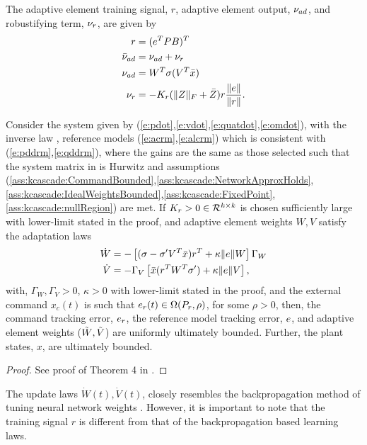 The adaptive element training signal, $r$, adaptive element output, $\nu_{ad}$, and robustifying
term, $\nu_r$, are given by
\[
\begin{split}
r      &= (e^TPB)^T \\
\bar{\nu}_{ad} &= \nu_{ad} + \nu_r \\
\nu_{ad}  &= W^T\sigma(V^T\bar{x}) \\
\nu_r   &= -K_r(\|Z\|_F + \bar{Z})r\frac{\|e\|}{\|r\|}.
\end{split}
\]

\begin{theorem}
\label{t:boundedness}
Consider the system
given by (\ref{e:pdot},\ref{e:vdot},\ref{e:quatdot},\ref{e:omdot}), with the inverse law
, reference models (\ref{e:acrm},\ref{e:alcrm}) which
is consistent with (\ref{e:pddrm},\ref{e:qddrm}),  where the gains are
the same as those selected such that the system matrix in
 is Hurwitz and assumptions (\ref{ass:kcascade:CommandBounded},\ref{ass:kcascade:NetworkApproxHolds},\ref{ass:kcascade:IdealWeightsBounded},\ref{ass:kcascade:FixedPoint},\ref{ass:kcascade:nullRegion}) are met. If $K_r > 0 \in \mathcal{R}^{k\times k}$ is chosen sufficiently large with
lower-limit stated in the proof, and adaptive element weights $W, V$ satisfy the
adaptation laws
\begin{equation}
\label{e:shladaptivelaws}
\begin{split}
\dot{W} &= -\left[ (\sigma - \sigma' V^T \bar{x} ) r^T + \kappa \|e\| W \right]\Gamma_W \\
\dot{V} &= -\Gamma_V \left[ \bar{x} (r^T W^T \sigma' )+ \kappa\|e\| V
\right],
\end{split}
\end{equation}
with, $\Gamma_W, \Gamma_V > 0$, $\kappa > 0$ with lower-limit stated
in the proof, and the external command $x_c(t)$ is such that $e_r(t)
\in \Omega(P_r,\rho)$, for some $\rho
> 0$, then, the command tracking error, $e_r$, the reference model
tracking error, $e$, and adaptive element weights ($\tilde{W},\tilde{V}$) are uniformly
ultimately bounded. Further, the plant states, $x$, are ultimately
bounded.
\end{theorem}
\begin{proof}
See proof of Theorem 4 in \cite{kannan:phd}.
\end{proof}
\begin{note}
The update laws $\dot{W}(t), \dot{V}(t)$, closely resembles the backpropagation method of tuning neural network weights \cite{Rumelhart:86Nature,Suykens:96bk,Haykin:98bk,Kim:98bk}. However, it is important to note that the training signal $r$ is different from that of the backpropagation based learning laws.
\end{note}


